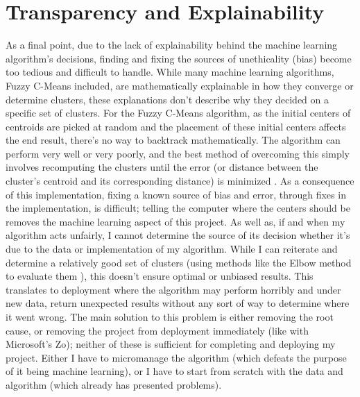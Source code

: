 \documentclass[10pt,twocolumn]{article}
\begin{document}
\section {Transparency and Explainability}

As a final point, due to the lack of explainability behind the machine learning algorithm’s decisions, finding and fixing the sources of unethicality (bias) become too tedious and difficult to handle. While many machine learning algorithms, Fuzzy C-Means included, are mathematically explainable in how they converge or determine clusters, these explanations don’t describe why they decided on a specific set of clusters. For the Fuzzy C-Means algorithm, as the initial centers of centroids are picked at random and the placement of these initial centers affects the end result, there’s no way to backtrack mathematically. The algorithm can perform very well or very poorly, and the best method of overcoming this simply involves recomputing the clusters until the error (or distance between the cluster’s centroid and its corresponding distance) is minimized \cite{GeeksForGeeks2019}. As a consequence of this implementation, fixing a known source of bias and error, through fixes in the implementation, is difficult; telling the computer where the centers should be removes the machine learning aspect of this project.
As well as, if and when my algorithm acts unfairly, I cannot determine the source of its decision whether it’s due to the data or implementation of my algorithm. While I can reiterate and determine a relatively good set of clusters (using methods like the Elbow method to evaluate them \cite{PrasadClustering}), this doesn’t ensure optimal or unbiased results. This translates to deployment where the algorithm may perform horribly and under new data, return unexpected results without any sort of way to determine where it went wrong. The main solution to this problem is either removing the root cause, or removing the project from deployment immediately (like with Microsoft’s Zo); neither of these is sufficient for completing and deploying my project. Either I have to micromanage the algorithm (which defeats the purpose of it being machine learning), or I have to start from scratch with the data and algorithm (which already has presented problems).

\printbibliography
 
\end{document}
